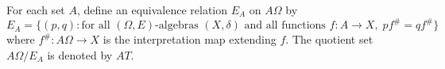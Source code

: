 For each set $A$, define an equivalence relation $E_A$ on $A\Omega$ by
$$E_A = \{(p, q): \text{for all } (\Omega, E)\text{-algebras } (X, \delta) \text{ and all functions } f: A \longrightarrow X,\; p f^\# = q f^\#\}$$
where $f^\# : A\Omega \longrightarrow X$ is the interpretation map extending $f$. The quotient set $A\Omega / E_A$ is denoted by $AT$.
